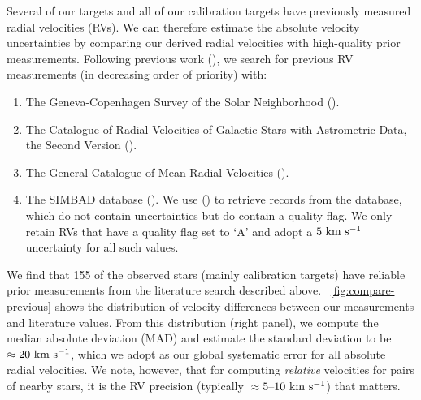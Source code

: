\documentclass[modern, letterpaper]{aastex61}
\begin{document}
Several of our targets and all of our calibration targets have previously
measured radial velocities (RVs).
We can therefore estimate the absolute velocity uncertainties by comparing our
derived radial velocities with high-quality prior measurements.
Following previous work (\citealt{Shaya:2011}), we search for previous RV
measurements (in decreasing order of priority) with:
\begin{enumerate}
  \item The Geneva-Copenhagen Survey of the Solar Neighborhood
  (\citealt{Nordstrom:2004}).
  \item The Catalogue of Radial Velocities of Galactic Stars with Astrometric
  Data, the Second Version (\citealt{Kharchenko:2007}).
  \item The General Catalogue of Mean Radial Velocities
  (\citealt{Barbier-Brossat:2000}).
  \item The SIMBAD database (\citealt{Wenger:2000}). We use 
  (\citealt{Ginsburg:2016}) to retrieve records from the database, which do not
  contain uncertainties but do contain a quality flag. We only retain RVs that
  have a quality flag set to `A' and adopt a $5~\mathrm{km}~\mathrm{s}^{-1}$ uncertainty for all such
  values.
\end{enumerate}
We find that 155 of the observed stars (mainly calibration targets) have
reliable prior measurements from the literature search described above.
\figurename~\ref{fig:compare-previous} shows the distribution of velocity
differences between our measurements and literature values.
From this distribution (right panel), we compute the median absolute deviation
(MAD) and estimate the standard deviation to be $\approx 20~\mathrm{km}~\mathrm{s}^{-1}$, which we
adopt as our global systematic error for all absolute radial velocities.
We note, however, that for computing \emph{relative} velocities for pairs of
nearby stars, it is the RV precision (typically $\approx 5$--$10~\mathrm{km}~\mathrm{s}^{-1}$) that
matters.
\end{document}
